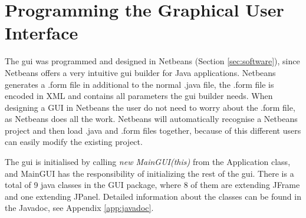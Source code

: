 \section{Programming the Graphical User Interface}
\label{secr:proggui}
The \acrshort{gui} was programmed and designed in Netbeans (Section \ref{sec:software}), since Netbeans offers a very intuitive \acrshort{gui} builder for Java applications. Netbeans generates a .form file in additional to the normal .java file, the .form file is encoded in XML and contains all parameters the \acrshort{gui} builder needs. When designing a GUI in Netbeans the user do not need to worry about the .form file, as Netbeans does all the work. Netbeans will automatically recognise a Netbeans project and then load .java and .form files together, because of this different users can easily modify the existing project.

The \acrshort{gui} is initialised by calling \textit{new MainGUI(this)} from the Application class, and MainGUI has the responsibility of initializing the rest of the \acrshort{gui}. There is a total of 9 java classes in the GUI package, where 8 of them are extending JFrame and one extending JPanel. Detailed information about the classes can be found in the Javadoc, see Appendix \ref{app:javadoc}.